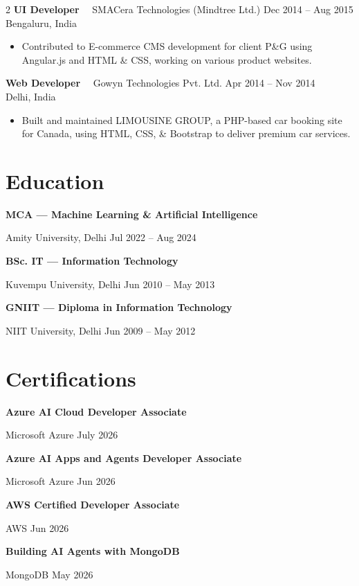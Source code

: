 \documentclass[10pt,a4paper]{article}
\newcommand{\job}[4]{%
  \vspace{2pt}
  {\fontsize{10}{11.5}\bfseries\color{sidebar}#1}
  {\color{textmuted}\ \textbar\ #2}
  \hfill
  {\fontsize{8.5}{10}\color{accent}#3}\\
  {\fontsize{8.4}{10}\color{textmuted}#4}
  \vspace{1pt}
}
\newcommand{\edu}[3]{%
  {\fontsize{8.8}{10.5}\bfseries\color{sidebar}#1}\par
  {\fontsize{8}{9.5}\color{textmuted}#2}
  \hfill {\fontsize{7.8}{9.5}\color{textmuted}#3}\par
  \vspace{4pt}
}
\begin{document}
\begin{paracol}{2}
\job{UI Developer}{SMACera Technologies (Mindtree Ltd.)}{Dec 2014 -- Aug 2015}{Bengaluru, India}
\begin{itemize}
  \item Contributed to E-commerce CMS development for client P\&G using Angular.js and HTML \& CSS, working on various product websites.
\end{itemize}

\job{Web Developer}{Gowyn Technologies Pvt. Ltd.}{Apr 2014 -- Nov 2014}{Delhi, India}
\begin{itemize}
  \item Built and maintained LIMOUSINE GROUP, a PHP-based car booking site for Canada, using HTML, CSS, \& Bootstrap to deliver premium car services.
\end{itemize}

\section{Education}

\edu{MCA — Machine Learning \& Artificial Intelligence}{Amity University, Delhi}{Jul 2022 -- Aug 2024}
\edu{BSc. IT — Information Technology}{Kuvempu University, Delhi}{Jun 2010 -- May 2013}
\edu{GNIIT — Diploma in Information Technology}{NIIT University, Delhi}{Jun 2009 -- May 2012}

\section{Certifications}

\edu{Azure AI Cloud Developer Associate}{Microsoft Azure}{July 2026}
\edu{Azure AI Apps and Agents Developer Associate}{Microsoft Azure}{Jun 2026}
\edu{AWS Certified Developer Associate}{AWS}{Jun 2026}
\edu{Building AI Agents with MongoDB}{MongoDB}{May 2026}

\end{paracol}
\end{document}
